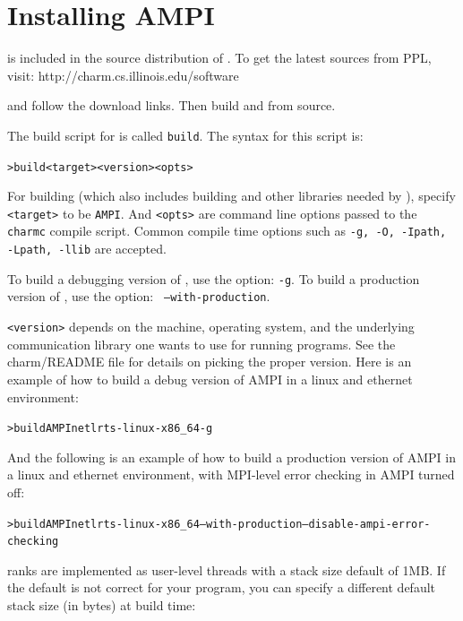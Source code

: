 \documentclass[10pt]{article}
\begin{document}
\appendix

\section{Installing AMPI}

\ampi{} is included in the source distribution of \charmpp{}.
To get the latest sources from PPL, visit:
	http://charm.cs.illinois.edu/software

and follow the download links.
Then build \charmpp{} and \ampi{} from source.

The build script for \charmpp{} is called \texttt{build}. The syntax for this
script is:

\begin{alltt}
> build <target> <version> <opts>
\end{alltt}

For building \ampi{} (which also includes building \charmpp{} and other
libraries needed by \ampi{}), specify \verb+<target>+ to be \verb+AMPI+. And
\verb+<opts>+ are command line options passed to the \verb+charmc+ compile
script.  Common compile time options such as \texttt{-g, -O, -Ipath, -Lpath,
-llib} are accepted.

To build a debugging version of \ampi{}, use the option: \texttt{-g}.
To build a production version of \ampi{}, use the option: \texttt{
--with-production}.

\verb+<version>+ depends on the machine, operating system, and the underlying
communication library one wants to use for running \ampi{} programs.
See the charm/README file for details on picking the proper version.
Here is an example of how to build a debug version of AMPI in a
linux and ethernet environment:

\begin{alltt}
> build AMPI netlrts-linux-x86_64 -g
\end{alltt}

And the following is an example of how to build a production version of AMPI in a
linux and ethernet environment, with MPI-level error checking in AMPI turned off:

\begin{alltt}
> build AMPI netlrts-linux-x86_64 --with-production --disable-ampi-error-checking
\end{alltt}

\ampi{} ranks are implemented as user-level threads with a stack size default of 1MB.
If the default is not correct for your program, you can specify a different default
stack size (in bytes) at build time:
\end{document}
